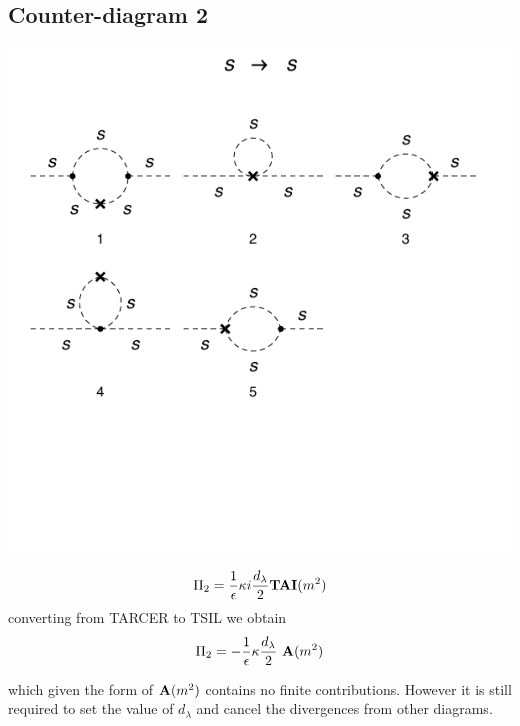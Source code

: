 \documentclass[11pt]{article}
\begin{document}
  \subsection*{Counter-diagram 2}
  \noindent\begin{minipage}{0.3\textwidth}
 \begin{center}
\includegraphics{2loop_2c.pdf}
\end{center}
\end{minipage}
\noindent\begin{minipage}{0.7\textwidth}

 \begin{align}
 \Pi_2 = \frac{ 1 }{\epsilon} \kappa i  \frac{d_{\lambda}}{2} {\tt{\mathbf{TAI}}}(m^2)
 \end{align}
 converting from TARCER to TSIL we obtain
  \begin{align}
 \Pi_2 = - \frac{ 1 }{\epsilon}\kappa \frac{d_{\lambda}}{2} \ {\tt{\mathbf{A}}}(m^2)
 \end{align}
 \end{minipage}
 which given the form of ${\tt{\mathbf{A}}}(m^2)$ contains no finite contributions.  However it is still required to set the value of $d_{\lambda}$ and cancel the divergences from other diagrams.

 
\end{document}
